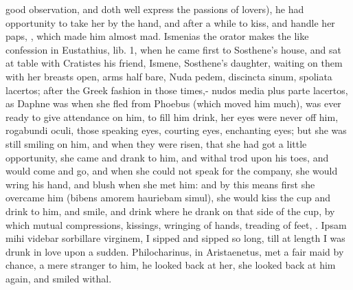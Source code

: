 good observation, and doth well express the passions of lovers), he had
opportunity to take her by the hand, and after a while to kiss, and
handle her paps, \etc{},  which made him almost mad. Ismenias the
orator makes the like confession in Eustathius, lib. 1, when he came
first to Sosthene's house, and sat at table with Cratistes his friend,
Ismene, Sosthene's daughter, waiting on them with her breasts open,
arms half bare, Nuda pedem, discincta sinum, spoliata lacertos;
after the Greek fashion in those times,- nudos media plus parte
lacertos, as Daphne was when she fled from Phoebus (which moved him
much), was ever ready to give attendance on him, to fill him drink, her
eyes were never off him, rogabundi oculi, those speaking eyes, courting
eyes, enchanting eyes; but she was still smiling on him, and when they
were risen, that she had got a little opportunity, she came and
drank to him, and withal trod upon his toes, and would come and go, and
when she could not speak for the company, she would wring his hand, and
blush when she met him: and by this means first she overcame him
(bibens amorem hauriebam simul), she would kiss the cup and drink to
him, and smile, and drink where he drank on that side of the cup, by
which mutual compressions, kissings, wringing of hands, treading of
feet, \etc{}. Ipsam mihi videbar sorbillare virginem, I sipped and sipped
so long, till at length I was drunk in love upon a sudden.
Philocharinus, in  Aristaenetus, met a fair maid by chance, a
mere stranger to him, he looked back at her, she looked back at him
again, and smiled withal.

